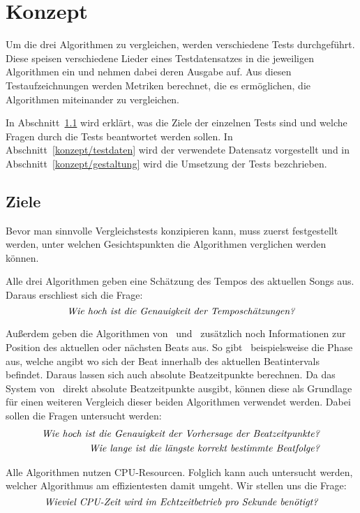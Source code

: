 \chapter{Konzept}
\label{konzept}

Um die drei Algorithmen zu vergleichen,
	werden verschiedene Tests durchgeführt.
Diese speisen verschiedene Lieder eines Testdatensatzes in die jeweiligen Algorithmen ein
	und nehmen dabei deren Ausgabe auf.
Aus diesen Testaufzeichnungen werden Metriken berechnet,
	die es ermöglichen,
	die Algorithmen miteinander zu vergleichen.

In Abschnitt~\ref{konzept/ziele} wird erklärt,
	was die Ziele der einzelnen Tests sind
	und welche Fragen durch die Tests beantwortet werden sollen.
In Abschnitt~\ref{konzept/testdaten} wird der verwendete Datensatz vorgestellt
	und in Abschnitt~\ref{konzept/gestaltung} wird die Umsetzung der Tests bezchrieben.


\section{Ziele} \label{konzept/ziele}
{
	Bevor man sinnvolle Vergleichstests konzipieren kann,
		muss zuerst festgestellt werden,
		unter welchen Gesichtspunkten die Algorithmen verglichen werden können.

	Alle drei Algorithmen geben eine Schätzung des Tempos des aktuellen Songs aus.
	Daraus erschliest sich die Frage:
	\begin{equation}
		\label{question:tempo}
		\text{\emph{Wie hoch ist die Genauigkeit der Temposchätzungen?}}
	\end{equation}

	Außerdem geben die Algorithmen von~\cite{2009_DaPlSt} und~\cite{2011_PlRoSt} zusätzlich noch Informationen zur Position des aktuellen oder nächsten Beats aus.
	So gibt~\cite{2011_PlRoSt} beispielsweise die Phase aus,
		welche angibt wo sich der Beat innerhalb des aktuellen Beatintervals befindet.
	Daraus lassen sich auch absolute Beatzeitpunkte berechnen.
	Da das System von~\cite{2009_DaPlSt} direkt absolute Beatzeitpunkte ausgibt,
		können diese als Grundlage für einen weiteren Vergleich dieser beiden Algorithmen verwendet werden.
	Dabei sollen die Fragen untersucht werden:
	\begin{align}
		\label{question:beat}
		\text{\emph{Wie hoch ist die Genauigkeit der Vorhersage der Beatzeitpunkte?}} \\
		\label{question:streak}
		\text{\emph{Wie lange ist die längste korrekt bestimmte Beatfolge?}}
	\end{align}

	Alle Algorithmen nutzen CPU-Resourcen.
	Folglich kann auch untersucht werden,
		welcher Algorithmus am effizientesten damit umgeht.
	Wir stellen uns die Frage:
	\begin{equation}
		\label{question:cpu_time}
		\text{\emph{Wieviel CPU-Zeit wird im Echtzeitbetrieb pro Sekunde benötigt?}}
	\end{equation}
}

